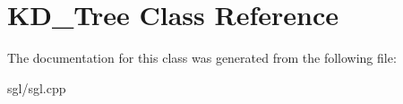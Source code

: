 \hypertarget{class_k_d___tree}{}\section{K\+D\+\_\+\+Tree Class Reference}
\label{class_k_d___tree}


The documentation for this class was generated from the following file\+:\begin{DoxyCompactItemize}
\item 
sgl/sgl.\+cpp\end{DoxyCompactItemize}

